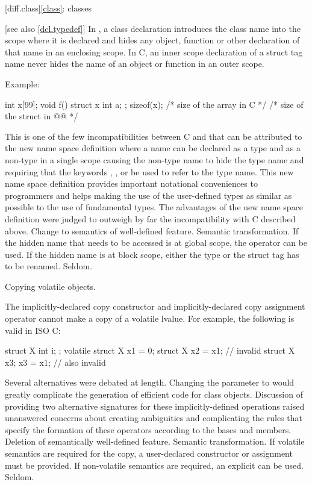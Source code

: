 [diff.class]{\ref{class}: classes}

 [see also \ref{dcl.typedef}]
\change
In \Cpp{}, a class declaration introduces the class name into the scope where it is
declared and hides any object, function or other declaration of that name in an enclosing
scope. In C, an inner scope declaration of a struct tag name never hides the name of an
object or function in an outer scope.

Example:
\begin{codeblock}
int x[99];
void f() {
  struct x { int a; };
  sizeof(x);  /* size of the array in C */
  /* size of the struct in @\textit{\textrm{\Cpp{}}}@ */
}
\end{codeblock}
\rationale
This is one of the few incompatibilities between C and \Cpp{} that
can be attributed to the new \Cpp{} name space definition where a
name can be declared as a type and as a non-type in a single scope
causing the non-type name to hide the type name and requiring that
the keywords , ,  or  be used to refer to the type name.
This new name space definition provides important notational
conveniences to \Cpp{} programmers and helps making the use of the
user-defined types as similar as possible to the use of fundamental
types.
The advantages of the new name space definition were judged to
outweigh by far the incompatibility with C described above.
\effect
Change to semantics of well-defined feature.
\difficulty
Semantic transformation.
If the hidden name that needs to be accessed is at global scope,
the \tcode{::} \Cpp{} operator can be used.
If the hidden name is at block scope, either the type or the struct
tag has to be renamed.
\howwide
Seldom.

\change
Copying volatile objects.

The implicitly-declared copy constructor and
implicitly-declared copy assignment operator
cannot make a copy of a volatile lvalue.
For example, the following is valid in ISO C:
\begin{codeblock}
struct X { int i; };
volatile struct X x1 = {0};
struct X x2 = x1;               // invalid \Cpp{}
struct X x3;
x3 = x1;                        // also invalid \Cpp{}
\end{codeblock}

\rationale
Several alternatives were debated at length.
Changing the parameter to
would greatly complicate the generation of
efficient code for class objects.
Discussion of
providing two alternative signatures for these
implicitly-defined operations raised
unanswered concerns about creating
ambiguities and complicating
the rules that specify the formation of
these operators according to the bases and
members.
\effect
Deletion of semantically well-defined feature.
\difficulty
Semantic transformation.
If volatile semantics are required for the copy,
a user-declared constructor or assignment must
be provided.
If non-volatile semantics are required,
an explicit
can be used.
\howwide
Seldom.

